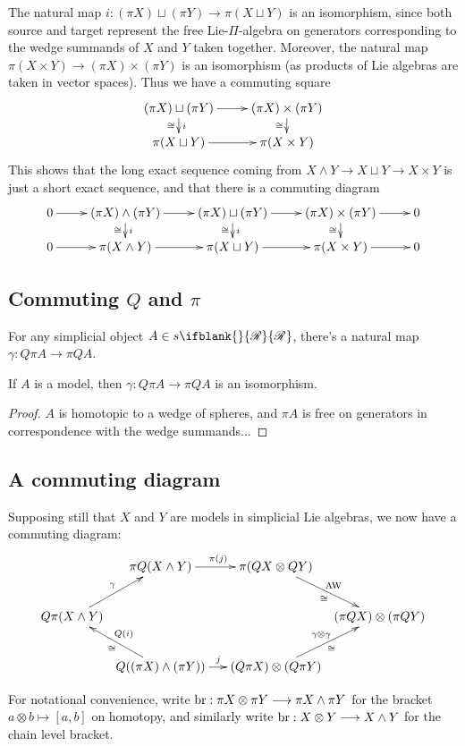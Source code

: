 \documentclass[10pt]{article}
\newcommand{\PRLie}[1]%
{\ifblank{#1}{\scrR}{\scrR^{#1}}}
\begin{document}
\begin{backgroundOnMultiplicativity}
The natural map $i:(\pi X)\sqcup (\pi Y)\to \pi(X\sqcup Y)$ is an isomorphism, since both source and target represent the free Lie-$\Pi$-algebra on generators corresponding to the wedge summands of $X$ and $Y$ taken together. Moreover, the natural map $\pi(X\times Y)\to (\pi X)\times (\pi Y)$ is an isomorphism (as products of Lie algebras are taken in vector spaces). Thus we have a commuting square
\[\xymatrix@R=4mm{
(\pi X)\sqcup (\pi Y)
\ar[r]
\ar[d]^-{i}_-{\cong}
&%
(\pi X)\times (\pi Y)
\ar[d]_-{\cong}\\
\pi (X\sqcup Y)
\ar[r]
&%
\pi (X\times Y)
}\]
This shows that the long exact sequence coming from $X\wedge Y\to X\sqcup Y\to X\times Y$ is just a short exact sequence, and that there is a commuting diagram
\[\xymatrix@R=4mm{
0\ar[r]&%
(\pi X)\wedge (\pi Y)
\ar[r]
\ar[d]^-{i}_-{\cong}
&%
(\pi X)\sqcup (\pi Y)
\ar[r]
\ar[d]^-{i}_-{\cong}
&%
(\pi X)\times (\pi Y)
\ar[r]
\ar[d]_-{\cong}
&%
0\\%
0\ar[r]&%
\pi (X\wedge  Y)
\ar[r]
&%
\pi (X\sqcup Y)
\ar[r]
&%
\pi (X\times Y)
\ar[r]
&%
0
}\]
\subsection{Commuting $Q$ and $\pi$}
For any simplicial object $A\in s\PRLie{}$, there's a natural map $\gamma:Q\pi A\to \pi QA$.
\begin{lem}
If $A$ is a model, then $\gamma:Q\pi A\to \pi QA$ is an isomorphism.
\end{lem}
\begin{proof}
$A$ is homotopic to a wedge of spheres, and $\pi A$ is free on generators in correspondence with the wedge summands...
\end{proof}
\subsection{A commuting diagram}
Supposing still that $X$ and $Y$ are models in simplicial Lie algebras, we now have a commuting diagram:
\[
\xymatrix@C-2em{
& \pi Q(X\wedge Y) \ar[rr]^{\pi(j)} && \pi(QX\otimes QY) \ar[dr]^{\textup{AW}}_{\cong} \\
Q\pi(X\wedge Y) \ar[ur]^{\gamma} &&&& (\pi QX)\otimes (\pi QY) \ar[dl];[]^{\gamma\otimes\gamma}_{\cong} \\
& Q((\pi X)\wedge (\pi Y)) \ar[ul]^{\cong}_{Q(i)} && (Q\pi X)\otimes (Q\pi Y) \ar[ll];[]^{j}
}
\]


For notational convenience, write $\textup{br}:\pi X\otimes \pi Y\to \pi X\wedge \pi Y$ for the bracket $a\otimes b\mapsto [a,b]$ on homotopy, and similarly write $\textup{br}:X\otimes Y\to X\wedge Y$ for the chain level bracket.


\end{backgroundOnMultiplicativity}
\end{document}
